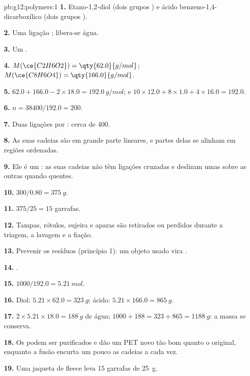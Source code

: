 \begin{solution}{pb:g12:polymers:1}
\textbf{1.} Etano-1,2-diol (dois grupos ) e ácido
benzeno-1,4-dicarboxílico (dois grupos ).

\textbf{2.} Uma ligação ; libera-se água.

\textbf{3.} Um .

\textbf{4.} $M(\ce{C2H6O2}) = \qty{62.0}{g/mol}$; $M(\ce{C8H6O4}) =
\qty{166.0}{g/mol}$.

\textbf{5.} $62.0 + 166.0 - 2 \times 18.0 = \qty{192.0}{g/mol}$; e
$10 \times 12.0 + 8 \times 1.0 + 4 \times 16.0 = 192.0$.

\textbf{6.} $n = 38400/192.0 = 200$.

\textbf{7.} Duas ligações  por : cerca de 400.

\textbf{8.} As suas cadeias são em grande parte lineares, e partes delas
se alinham em regiões ordenadas.

\textbf{9.} Ele é um : as suas cadeias não têm ligações
cruzadas e deslizam umas sobre as outras quando quentes.

\textbf{10.} $300/0.80 = \qty{375}{g}$.

\textbf{11.} $375/25 = 15$ garrafas.

\textbf{12.} Tampas, rótulos, sujeira e aparas são retirados ou perdidos
durante a triagem, a lavagem e a fiação.

\textbf{13.} Prevenir os resíduos (princípio 1): um objeto usado vira
.

\textbf{14.} .

\textbf{15.} $1000/192.0 = \qty{5.21}{mol}$.

\textbf{16.} Diol: $5.21 \times 62.0 = \qty{323}{g}$; ácido:
$5.21 \times 166.0 = \qty{865}{g}$.

\textbf{17.} $2 \times 5.21 \times 18.0 = \qty{188}{g}$ de água;
$1000 + 188 = 323 + 865 = \qty{1188}{g}$: a massa se conserva.

\textbf{18.} Os  podem ser purificados e dão um PET novo tão
bom quanto o original, enquanto a fusão encurta um pouco as cadeias a
cada vez.

\textbf{19.} Uma jaqueta de fleece leva 15 garrafas de \qty{25}{g}.
\end{solution}
